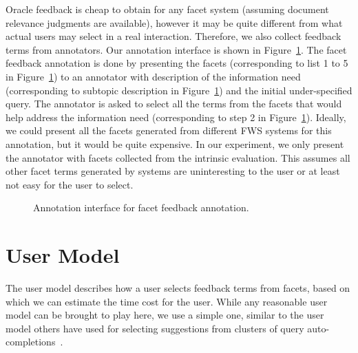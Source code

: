 Oracle feedback is cheap to obtain for any facet system (assuming document relevance judgments are available), however it may be quite different from what actual users may select in a real interaction. Therefore, we also collect feedback terms from annotators. Our annotation interface is shown in Figure~\ref{fig:feedback-annotation}. The facet feedback annotation is done by presenting the facets (corresponding to list 1 to 5 in Figure~\ref{fig:feedback-annotation}) to an annotator with description of the information need (corresponding to subtopic description in Figure~\ref{fig:feedback-annotation}) and the initial under-specified query. The annotator is asked to select all the terms from the facets that would help address the information need (corresponding to step 2 in Figure~\ref{fig:feedback-annotation}). Ideally, we could present all the facets generated from different FWS systems for this annotation, but it would be quite expensive. In our experiment, we only present the annotator with facets collected 
from the intrinsic evaluation. This assumes all other facet terms generated by systems are uninteresting to the user or at least not easy for the user to select.

\begin{figure}[!ht]
\centering
{}
\caption{Annotation interface for facet feedback annotation.}
\label{fig:feedback-annotation}
\end{figure}

\section{User Model} \label{sec:user-model}
The user model describes how a user selects feedback terms from facets, based on which we can estimate the time cost for the user. While any reasonable user model can be brought to play here, we use a simple one, similar to the user model others have used for selecting suggestions from clusters of query auto-completions~\cite{jain2010organizing}.

